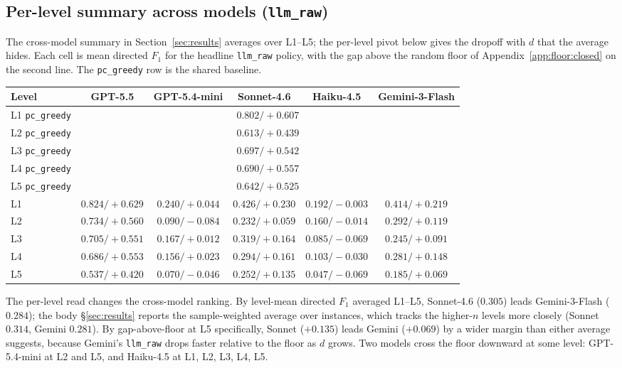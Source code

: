 \subsection{Per-level summary across models (\texttt{llm\_raw})}
\label{app:results:per-level}

The cross-model summary in Section~\ref{sec:results} averages over L1--L5; the per-level pivot below gives the dropoff with $d$ that the average hides. Each cell is mean directed $F_1$ for the headline \texttt{llm\_raw} policy, with the gap above the random floor of Appendix~\ref{app:floor:closed} on the second line. The \texttt{pc\_greedy} row is the shared baseline.

\begin{center}
\scriptsize
\setlength{\tabcolsep}{3.5pt}
\begin{tabular}{@{}l c c c c c@{}}
\toprule
Level & GPT-5.5 & GPT-5.4-mini & Sonnet-4.6 & Haiku-4.5 & Gemini-3-Flash \\
\midrule
L1 \texttt{pc\_greedy} & \multicolumn{5}{c}{$0.802 / +0.607$} \\
L2 \texttt{pc\_greedy} & \multicolumn{5}{c}{$0.613 / +0.439$} \\
L3 \texttt{pc\_greedy} & \multicolumn{5}{c}{$0.697 / +0.542$} \\
L4 \texttt{pc\_greedy} & \multicolumn{5}{c}{$0.690 / +0.557$} \\
L5 \texttt{pc\_greedy} & \multicolumn{5}{c}{$0.642 / +0.525$} \\
\midrule
L1 & $0.824 / +0.629$ & $0.240 / +0.044$ & $0.426 / +0.230$ & $0.192 / -0.003$ & $0.414 / +0.219$ \\
L2 & $0.734 / +0.560$ & $0.090 / -0.084$ & $0.232 / +0.059$ & $0.160 / -0.014$ & $0.292 / +0.119$ \\
L3 & $0.705 / +0.551$ & $0.167 / +0.012$ & $0.319 / +0.164$ & $0.085 / -0.069$ & $0.245 / +0.091$ \\
L4 & $0.686 / +0.553$ & $0.156 / +0.023$ & $0.294 / +0.161$ & $0.103 / -0.030$ & $0.281 / +0.148$ \\
L5 & $0.537 / +0.420$ & $0.070 / -0.046$ & $0.252 / +0.135$ & $0.047 / -0.069$ & $0.185 / +0.069$ \\
\bottomrule
\end{tabular}
\end{center}

The per-level read changes the cross-model ranking. By level-mean directed $F_1$ averaged L1--L5, Sonnet-4.6 ($0.305$) leads Gemini-3-Flash ($0.284$); the body \S\ref{sec:results} reports the sample-weighted average over instances, which tracks the higher-$n$ levels more closely (Sonnet $0.314$, Gemini $0.281$). By gap-above-floor at L5 specifically, Sonnet ($+0.135$) leads Gemini ($+0.069$) by a wider margin than either average suggests, because Gemini's \texttt{llm\_raw} drops faster relative to the floor as $d$ grows. Two models cross the floor downward at some level: GPT-5.4-mini at L2 and L5, and Haiku-4.5 at L1, L2, L3, L4, L5.

